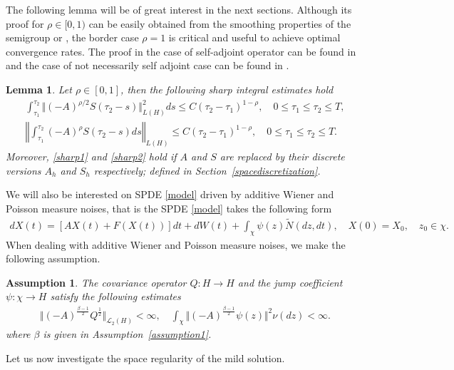 \documentclass[review,12pt]{elsarticle}
\newtheorem{Assumption}{Assumption}[section]
\newtheorem{lemma}{Lemma}[section]
\newcommand{\secref}[1]{{Section~\ref{#1}}}
\newcommand{\assref}[1]{{Assumption~\ref{#1}}}
\begin{document}
The following lemma will be of great interest in the next sections. Although its proof for $\rho\in[0,1)$ can be easily obtained from the smoothing properties of the semigroup \cite[Proposition 2.2]{Antonio1} or \cite{Henry}, the border case $\rho=1$ is critical and useful to achieve optimal convergence rates. The proof in the case of self-adjoint operator can be found in \cite[Lemma 3.2 (iii)]{Stig1} and the case of not necessarily self adjoint case can be found in \cite[Lemma 2.1]{Antjd1}.
 \begin{lemma}
 \label{sharpestimates}
 Let  $\rho\in[0, 1]$, then the following sharp integral estimates hold
 \begin{eqnarray}
 \label{sharp1}
 \int_{\tau_1}^{\tau_2}\Vert (-A)^{\rho/2}S(\tau_2-s)\Vert_{L(H)}^2 ds\leq C(\tau_2-\tau_1)^{1-\rho},\quad 0\leq \tau_1\leq \tau_2\leq T,\\
 \label{sharp2}
 \left\Vert  \int_{\tau_1}^{\tau_2}(-A)^{\rho}S(\tau_2-s) ds\right\Vert_{L(H)}\leq C(\tau_2-\tau_1)^{1-\rho},\quad 0\leq \tau_1\leq \tau_2\leq T.
 \end{eqnarray}
 Moreover, \eqref{sharp1} and \eqref{sharp2} hold if $A$ and $S$ are replaced by their discrete versions $A_h$ and $S_h$ respectively; defined in \secref{spacediscretization}.
 \end{lemma}
 We will also be interested on SPDE \eqref{model} driven by additive Wiener and Poisson measure noises, that is the SPDE \eqref{model} takes the following form
 \begin{eqnarray}
 \label{model3}
 dX(t)=[AX(t)+F(X(t))]dt+dW(t)+\int_{\chi}\psi(z)\widetilde{N}(dz,dt),\quad X(0)=X_0,\quad z_0\in\chi.
  \end{eqnarray}
 When dealing with additive Wiener and Poisson measure noises, we make the following assumption.
 \begin{Assumption}
 \label{assumption5}
 The covariance operator $Q:H\longrightarrow H$ and the jump coefficient $\psi :\chi\longrightarrow H$  satisfy the following estimates
 \begin{eqnarray}
 \label{wiener}
 \Vert (-A)^{\frac{\beta-1}{2}}Q^{\frac{1}{2}}\Vert_{\mathcal{L}_2(H)}<\infty,\quad
\int_{\chi} \Vert (-A)^{\frac{\beta-1}{2}}\psi(z)\Vert^2\nu(dz)<\infty.
 \end{eqnarray}
 where $\beta$ is given in \assref{assumption1}.
 \end{Assumption}
Let us now investigate the space regularity of the mild solution.
\end{document}
